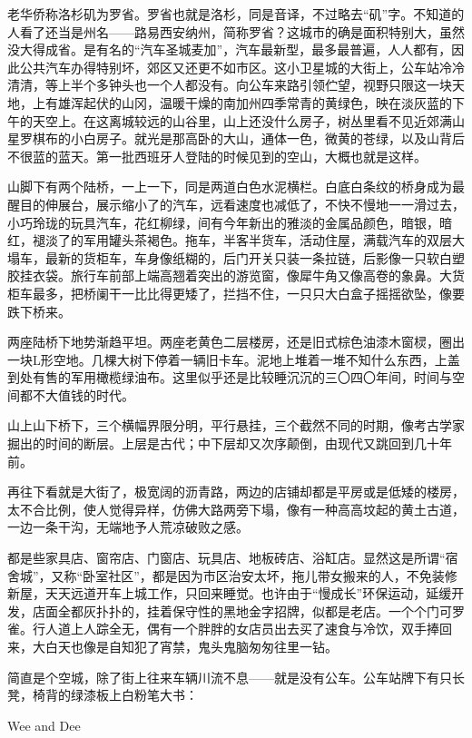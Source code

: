 \par 老华侨称洛杉矶为罗省。罗省也就是洛杉，同是音译，不过略去“矶”字。不知道的人看了还当是州名——路易西安纳州，简称罗省？这城市的确是面积特别大，虽然没大得成省。是有名的“汽车圣城麦加”，汽车最新型，最多最普遍，人人都有，因此公共汽车办得特别坏，郊区又还更不如市区。这小卫星城的大街上，公车站冷冷清清，等上半个多钟头也一个人都没有。向公车来路引领伫望，视野只限这一块天地，上有雄浑起伏的山冈，温暖干燥的南加州四季常青的黄绿色，映在淡灰蓝的下午的天空上。在这离城较远的山谷里，山上还没什么房子，树丛里看不见近郊满山星罗棋布的小白房子。就光是那高卧的大山，通体一色，微黄的苍绿，以及山背后不很蓝的蓝天。第一批西班牙人登陆的时候见到的空山，大概也就是这样。
\par 山脚下有两个陆桥，一上一下，同是两道白色水泥横栏。白底白条纹的桥身成为最醒目的伸展台，展示缩小了的汽车，远看速度也减低了，不快不慢地一一滑过去，小巧玲珑的玩具汽车，花红柳绿，间有今年新出的雅淡的金属品颜色，暗银，暗红，褪淡了的军用罐头茶褐色。拖车，半客半货车，活动住屋，满载汽车的双层大塌车，最新的货柜车，车身像纸糊的，后门开关只装一条拉链，后影像一只软白塑胶挂衣袋。旅行车前部上端高翘着突出的游览窗，像犀牛角又像高卷的象鼻。大货柜车最多，把桥阑干一比比得更矮了，拦挡不住，一只只大白盒子摇摇欲坠，像要跌下桥来。
\par 两座陆桥下地势渐趋平坦。两座老黄色二层楼房，还是旧式棕色油漆木窗棂，圈出一块L形空地。几棵大树下停着一辆旧卡车。泥地上堆着一堆不知什么东西，上盖到处有售的军用橄榄绿油布。这里似乎还是比较睡沉沉的三〇四〇年间，时间与空间都不大值钱的时代。
\par 山上山下桥下，三个横幅界限分明，平行悬挂，三个截然不同的时期，像考古学家掘出的时间的断层。上层是古代；中下层却又次序颠倒，由现代又跳回到几十年前。
\par 再往下看就是大街了，极宽阔的沥青路，两边的店铺却都是平房或是低矮的楼房，太不合比例，使人觉得异样，仿佛大路两旁下塌，像有一种高高坟起的黄土古道，一边一条干沟，无端地予人荒凉破败之感。
\par 都是些家具店、窗帘店、门窗店、玩具店、地板砖店、浴缸店。显然这是所谓“宿舍城”，又称“卧室社区”，都是因为市区治安太坏，拖儿带女搬来的人，不免装修新屋，天天远道开车上城工作，只回来睡觉。也许由于“慢成长”环保运动，延缓开发，店面全都灰扑扑的，挂着保守性的黑地金字招牌，似都是老店。一个个门可罗雀。行人道上人踪全无，偶有一个胖胖的女店员出去买了速食与冷饮，双手捧回来，大白天也像是自知犯了宵禁，鬼头鬼脑匆匆往里一钻。
\par 简直是个空城，除了街上往来车辆川流不息——就是没有公车。公车站牌下有只长凳，椅背的绿漆板上白粉笔大书：
\par Wee and Dee

